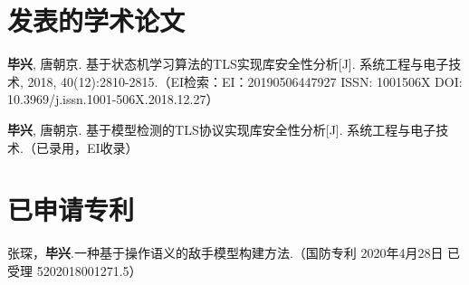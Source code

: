 \begin{resume}
\section*{发表的学术论文} %
\begin{enumerate}[label={$\,\,$[\arabic{enumi}]},labelwidth=1em,leftmargin=0pt,itemindent=\parindent+\labelsep+1em,itemsep=0pt,align=left]
\addtolength{\itemsep}{-.36\baselineskip}%
\item
\textbf{毕兴}, 唐朝京. 基于状态机学习算法的TLS实现库安全性分析[J]. 系统工程与电子技术, 2018, 40(12):2810-2815.（EI检索：EI：20190506447927  ISSN: 1001506X DOI: 10.3969/j.issn.1001-506X.2018.12.27）

\item\textbf{毕兴}, 唐朝京. 基于模型检测的TLS协议实现库安全性分析[J]. 系统工程与电子技术.（已录用，EI收录）

\end{enumerate}
\section*{已申请专利} %
\begin{enumerate}[label={$\,\,$[\arabic{enumi}]},labelwidth=1em,leftmargin=0pt,itemindent=\parindent+\labelsep+1em,itemsep=0pt,align=left]\addtolength{\itemsep}{-.36\baselineskip}%
\item 张琛，\textbf{毕兴}.一种基于操作语义的敌手模型构建方法.（国防专利 2020年4月28日 已受理 5202018001271.5）

\end{enumerate}



\end{resume}
